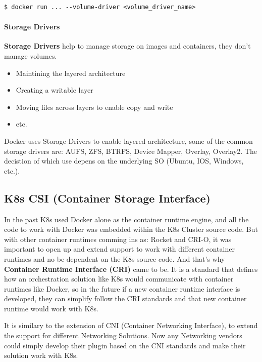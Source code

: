 \documentclass{article}
\newenvironment{codetemplate}[1][]{%
  \mybasecolorbox[#1]
  \itshape
}{%
  \endmybasecolorbox
}
\begin{document}
\begin{codetemplate}{}
\begin{verbatim}
$ docker run ... --volume-driver <volume_driver_name>
\end{verbatim}
\end{codetemplate}

\paragraph{Storage Drivers}
\textbf{Storage Drivers} help to manage storage on images and containers, they don't manage volumes.
\begin{itemize}
    \item Maintining the layered architecture
    \item Creating a writable layer
    \item Moving files across layers to enable copy and write 
    \item etc.
\end{itemize}

Docker uses Storage Drivers to enable layered architecture, some of the common storage drivers are: AUFS, ZFS, BTRFS, Device Mapper, Overlay, Overlay2. The decistion of which use depens on the underlying SO (Ubuntu, IOS, Windows, etc.).

\subsection{K8s CSI (Container Storage Interface)}

In the past K8s used Docker alone as the container runtime engine, and all the code to work with Docker was embedded within the K8s Cluster source code. But with other container runtimes comming ins as: Rocket and CRI-O, it was important to open up and extend support to work with different container runtimes and no be dependent on the K8s source code. And that's why \textbf{Container Runtime Interface (CRI)} came to be. It is a standard that defines how an orchestration solution like K8s would communicate with container runtimes like Docker, so in the future if a new container runtime interface is developed, they can simplify follow the CRI standards and that new container runtime would work with K8s.

It is similary to the extension of CNI (Container Networking Interface), to extend the support for different Networking Solutions. Now any Networking vendors could simply develop their plugin based on the CNI standards and make their solution work with K8s.
\end{document}

